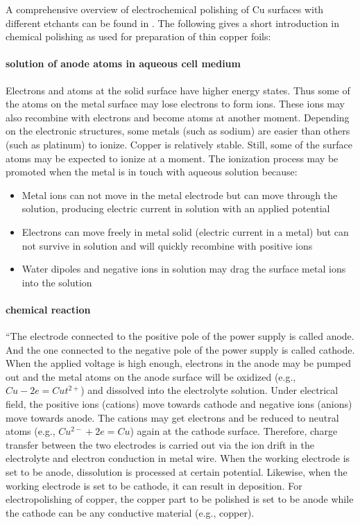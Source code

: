 A comprehensive overview of  electrochemical polishing of Cu surfaces with different etchants can be found in \cite{jinshan_electrochemical_2004}. The following gives a short introduction in chemical polishing as used for preparation of thin copper foils:

\paragraph{solution of anode atoms in aqueous cell medium}
Electrons and atoms at the solid surface have higher energy states. Thus some of the atoms on the metal surface may lose electrons to form ions. These ions may also recombine with electrons and become atoms at another moment. Depending on the electronic structures, some metals (such as sodium) are easier than others (such as platinum) to ionize. Copper is relatively stable. Still, some of the surface atoms may be expected to ionize at a moment. The ionization process may be promoted when the metal is in touch with aqueous solution because: 
\begin{itemize}
 \item Metal ions can not move in the metal electrode but can move through the solution, producing electric current in solution with an applied potential
 \item Electrons can move freely in metal solid (electric current in a metal) but can not survive in solution and will quickly recombine with positive ions
 \item Water dipoles and negative ions in solution may drag the surface metal ions into the solution
\end{itemize}

\paragraph{chemical reaction}
``The electrode connected to the positive pole of the power supply is called anode. And the one connected to the negative pole of the power supply is called cathode. When the applied voltage is high enough, electrons in the anode may be pumped out and the metal atoms on the anode surface will be oxidized (e.g., $Cu - 2e = Cut^{2+}$) and dissolved into the electrolyte solution. Under electrical field, the positive ions (cations) move towards cathode and negative ions (anions) move towards anode. The cations may get electrons and be reduced to neutral atoms (e.g., $Cu^{2-} + 2e = Cu$) again at the cathode surface. Therefore, charge transfer between the two electrodes is carried out via the ion drift in the electrolyte and electron conduction in metal wire. When the working electrode is set to be anode, dissolution is processed at certain potential. Likewise, when the working electrode is set to be cathode, it can result in deposition. For electropolishing of copper, the copper part to be polished is set to be anode while the cathode can be any conductive material (e.g., copper).


